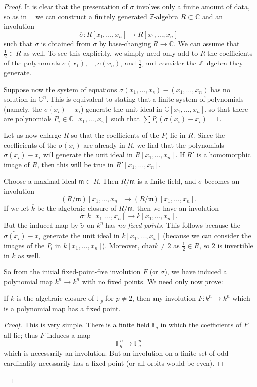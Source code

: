 \begin{proof} 
It is clear that the presentation of $\sigma$ involves only a finite amount of
data, so as in \cref{} we can construct a finitely generated
$\mathbb{Z}$-algebra $R \subset \mathbb{C}$ and an involution
\[ \overline{\sigma}: R[x_1, \dots, x_n] \to R[x_1, \dots, x_n] \] such that $\sigma$ is obtained from
$\overline{\sigma}$ by base-changing $R \to \mathbb{C}$.
We can assume that $\frac{1}{2} \in R$ as well.
To see this explicitly, we simply need only add to $R$ the coefficients of the
polynomials $\sigma(x_1), \dots, \sigma(x_n)$, and $\frac{1}{2}$, and
consider the $\mathbb{Z}$-algebra they generate.

Suppose now the system of equations $\sigma(x_1, \dots, x_n) - (x_1, \dots,
x_n)$ has no solution in $\mathbb{C}^n$. This is equivalent to stating that a
finite
system of polynomials (namely, the $\sigma(x_i) - x_i$) generate the unit ideal in $\mathbb{C}[x_1, \dots,
x_n]$, so that there are polynomials $P_i \in \mathbb{C}[x_1, \dots, x_n]$
such that $\sum P_i \left( \sigma(x_i) - x_i \right)  = 1$. 

Let us now enlarge $R$ so that the coefficients of the $P_i$ lie in $R$.
Since the coefficients of the $\sigma(x_i)$ are already in $R$, we find
that the polynomials $\sigma(x_i) - x_i$ will generate the unit ideal in
$R[x_1, \dots, x_n]$.
If $R'$ is a homomorphic image of $R$, then this will be true in $R'[x_1,
\dots, x_n]$.

Choose a maximal ideal $\mathfrak{m} \subset R$. Then $R/\mathfrak{m}$ is a
finite field, and $\sigma$ becomes an involution
\[ (R/\mathfrak{m})[x_1, \dots, x_n] \to (R/\mathfrak{m})[x_1, \dots, x_n].  \]
If we let $\overline{k}$ be the algebraic closure of $R/\mathfrak{m}$, then we
have an involution
\[ \widetilde{\sigma}: k[x_1, \dots, x_n] \to k[x_1, \dots, x_n].  \]
But the induced map by $\widetilde{\sigma}$ on $k^n$ has \emph{no fixed points.}  This follows because the
$\widetilde{\sigma(x_i)} - x_i$ generate the unit ideal in $k[x_1, \dots,
x_n]$ (because we can consider the images of the $P_i$ in $k[x_1, \dots, x_n]$).
Moreover, $\mathrm{char} k \neq 2$ as $\frac{1}{2} \in R$, so $2$ is
invertible in $k$ as well.

So from the initial fixed-point-free involution $F$ (or $\sigma$), we have
induced a 
polynomial map $k^n \to k^n$ with no fixed points. We need only now prove:

\begin{lemma} \label{easycaseoffptheorem}
If $k$ is the algebraic closure of $\mathbb{F}_p$ for $p \neq 2$, then any
involution $F: k^n \to k^n$ which is a polynomial map has  a fixed point.
\end{lemma} 
\begin{proof} 
This is very simple. There is a finite field $\mathbb{F}_q$ in which the
coefficients of $F$ all lie; thus $F$ induces a map
\[ \mathbb{F}_q^n \to \mathbb{F}_q^n  \]
which is necessarily an involution. But an involution on a finite set of odd
cardinality necessarily has a fixed point (or all orbits would be even).
\end{proof} 

\end{proof} 


